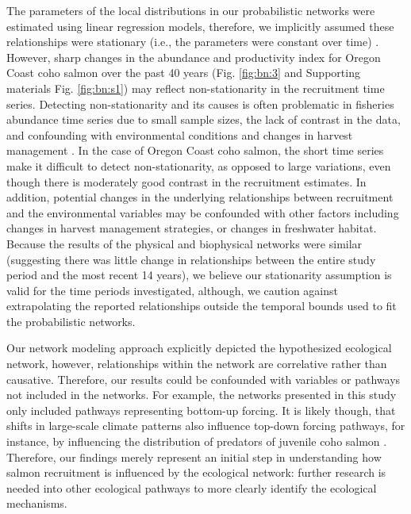 The parameters of the local distributions in our probabilistic networks were
estimated using linear regression models, therefore, we implicitly assumed these
relationships were stationary (i.e., the parameters were constant over time)
\citep{Walters1987a}. However, sharp changes in the abundance and productivity
index for Oregon Coast coho salmon over the past 40 years (Fig. \ref{fig:bn:3}
and Supporting materials Fig. \ref{fig:bn:s1}) may reflect non-stationarity in
the recruitment time series. Detecting non-stationarity and its causes is often
problematic in fisheries abundance time series due to small sample sizes, the
lack of contrast in the data, and confounding with environmental conditions and
changes in harvest management \citep{Walters1987a, Peterman2009a}. In the case
of Oregon Coast coho salmon, the short time series make it difficult to detect
non-stationarity, as opposed to large variations, even though there is
moderately good contrast in the recruitment estimates. In addition, potential
changes in the underlying relationships between recruitment and the
environmental variables may be confounded with other factors including changes
in harvest management strategies, or changes in freshwater habitat. Because the
results of the physical and biophysical networks were similar (suggesting there
was little change in relationships between the entire study period and the most
recent 14 years), we believe our stationarity assumption is valid for the time
periods investigated, although, we caution against extrapolating the reported
relationships outside the temporal bounds used to fit the probabilistic
networks.

Our network modeling approach explicitly depicted the hypothesized ecological
network, however, relationships within the network are correlative rather than
causative. Therefore, our results could be confounded with variables or pathways
not included in the networks. For example, the networks presented in this study
only included pathways representing bottom-up forcing. It is likely though, that
shifts in large-scale climate patterns also influence top-down forcing pathways,
for instance, by influencing the distribution of predators of juvenile coho
salmon \citep{Pearcy2002a, Perry2005a}. Therefore, our findings merely represent
an initial step in understanding how salmon recruitment is influenced by the
ecological network: further research is needed into other ecological pathways to
more clearly identify the ecological mechanisms.

